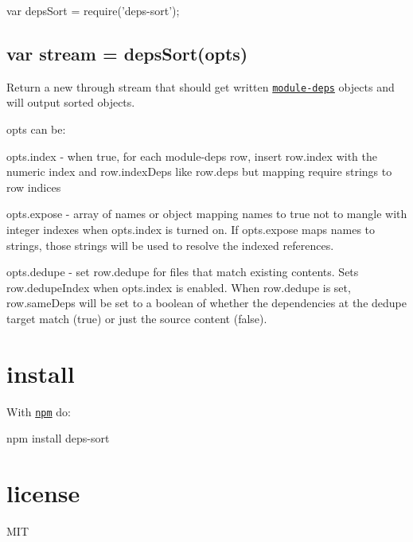 \begin{DoxyCode}
var depsSort = require('deps-sort');
\end{DoxyCode}


\subsection*{var stream = deps\+Sort(opts)}

Return a new through {\ttfamily stream} that should get written \href{https://npmjs.org/package/module-deps}{\tt module-\/deps} objects and will output sorted objects.

{\ttfamily opts} can be\+:


\begin{DoxyItemize}
\item {\ttfamily opts.\+index} -\/ when true, for each module-\/deps row, insert {\ttfamily row.\+index} with the numeric index and {\ttfamily row.\+index\+Deps} like {\ttfamily row.\+deps} but mapping require strings to row indices
\item {\ttfamily opts.\+expose} -\/ array of names or object mapping names to {\ttfamily true} not to mangle with integer indexes when {\ttfamily opts.\+index} is turned on. If {\ttfamily opts.\+expose} maps names to strings, those strings will be used to resolve the indexed references.
\item {\ttfamily opts.\+dedupe} -\/ set {\ttfamily row.\+dedupe} for files that match existing contents. Sets {\ttfamily row.\+dedupe\+Index} when {\ttfamily opts.\+index} is enabled. When {\ttfamily row.\+dedupe} is set, {\ttfamily row.\+same\+Deps} will be set to a boolean of whether the dependencies at the dedupe target match (true) or just the source content (false).
\end{DoxyItemize}

\section*{install}

With \href{https://npmjs.org}{\tt npm} do\+:


\begin{DoxyCode}
npm install deps-sort
\end{DoxyCode}


\section*{license}

M\+IT 